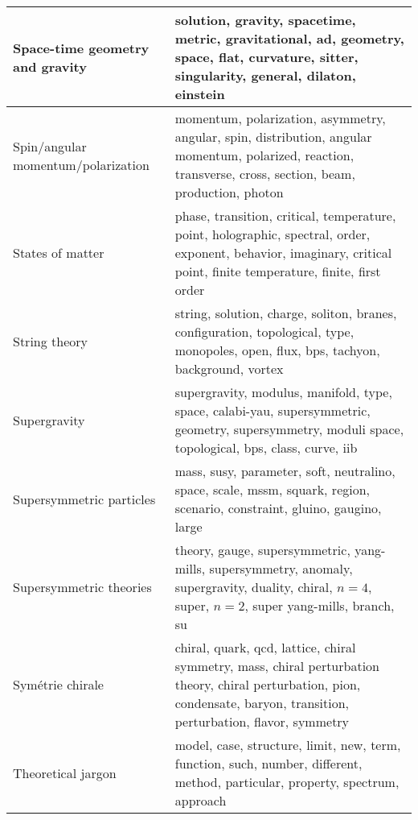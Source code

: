 \begin{longtable}[H]{p{}|p{}}
Space-time geometry and gravity                       &                                                                 solution, gravity, spacetime, metric, gravitational, ad, geometry, space, flat, curvature, sitter, singularity, general, dilaton, einstein \\ \midrule
Spin/angular momentum/polarization                    &                                                momentum, polarization, asymmetry, angular, spin, distribution, angular momentum, polarized, reaction, transverse, cross, section, beam, production, photon \\ \midrule
States of matter                                      &                                      phase, transition, critical, temperature, point, holographic, spectral, order, exponent, behavior, imaginary, critical point, finite temperature, finite, first order \\ \midrule
String theory                                         &                                                                       string, solution, charge, soliton, branes, configuration, topological, type, monopoles, open, flux, bps, tachyon, background, vortex \\ \midrule
Supergravity                                          &                                                       supergravity, modulus, manifold, type, space, calabi-yau, supersymmetric, geometry, supersymmetry, moduli space, topological, bps, class, curve, iib \\ \midrule
Supersymmetric particles                              &                                                                                  mass, susy, parameter, soft, neutralino, space, scale, mssm, squark, region, scenario, constraint, gluino, gaugino, large \\ \midrule
Supersymmetric theories                               &                                                        theory, gauge, supersymmetric, yang-mills, supersymmetry, anomaly, supergravity, duality, chiral, $n=4$, super, $n=2$, super yang-mills, branch, su \\ \midrule
Symétrie chirale                                      &                                  chiral, quark, qcd, lattice, chiral symmetry, mass, chiral perturbation theory, chiral perturbation, pion, condensate, baryon, transition, perturbation, flavor, symmetry \\ \midrule
Theoretical jargon                                    &                                                                              model, case, structure, limit, new, term, function, such, number, different, method, particular, property, spectrum, approach \\ \midrule

\end{longtable}
